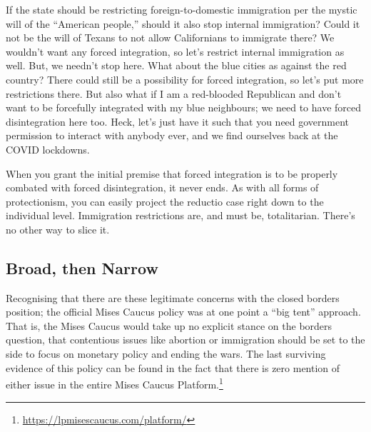 \documentclass[11pt]{article}
\begin{document}
If the state should be restricting foreign-to-domestic immigration per the mystic will of the ``American people,'' should it also stop internal immigration? Could it not be the will of Texans to not allow Californians to immigrate there? We wouldn't want any forced integration, so let's restrict internal immigration as well. But, we needn't stop here. What about the blue cities as against the red country? There could still be a possibility for forced integration, so let's put more restrictions there. But also what if I am a red-blooded Republican and don't want to be forcefully integrated with my blue neighbours; we need to have forced disintegration here too. Heck, let's just have it such that you need government permission to interact with anybody ever, and we find ourselves back at the COVID lockdowns.

When you grant the initial premise that forced integration is to be properly combated with forced disintegration, it never ends. As with all forms of protectionism, you can easily project the reductio case right down to the individual level. Immigration restrictions are, and must be, totalitarian. There's no other way to slice it.
\subsection{Broad, then Narrow}
\label{sec:orgadbde35}
Recognising that there are these legitimate concerns with the closed borders position; the official Mises Caucus policy was at one point a ``big tent'' approach. That is, the Mises Caucus would take up no explicit stance on the borders question, that contentious issues like abortion or immigration should be set to the side to focus on monetary policy and ending the wars. The last surviving evidence of this policy can be found in the fact that there is zero mention of either issue in the entire Mises Caucus Platform.\footnote{\url{https://lpmisescaucus.com/platform/}}
\end{document}
